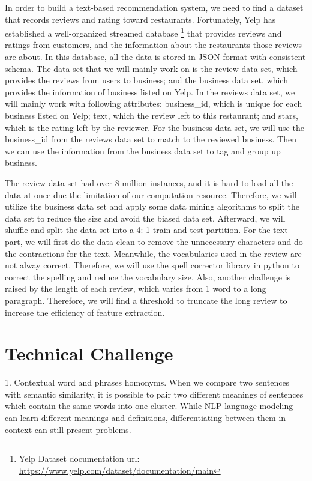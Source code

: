 \documentclass[11pt]{article}
\begin{document}
In order to build a text-based recommendation system, we need to find a dataset that records reviews and rating toward restaurants. Fortunately, Yelp has established a well-organized streamed database \footnote{Yelp Dataset documentation url: \url{https://www.yelp.com/dataset/documentation/main}} that provides reviews and ratings from customers, and the information about the restaurants those reviews are about. In this database, all the data is stored in JSON format with consistent schema. The data set that we will mainly work on is the review data set, which provides the reviews from users to business; and the business data set, which provides the information of business listed on Yelp. In the reviews data set, we will mainly work with following attributes: business\_id, which is unique for each business listed on Yelp; text, which the review left to this restaurant; and stars, which is the rating left by the reviewer. For the business data set, we will use the business\_id from the reviews data set to match to the reviewed business. Then we can use the information from the business data set to tag and group up business. 

The review data set had over 8 million instances, and it is hard to load all the data at once due the limitation of our computation resource. Therefore, we will utilize the business data set and apply some data mining algorithms to split the data set to reduce the size and avoid the biased data set. Afterward, we will shuffle and split the data set into a 4: 1 train and test partition. For the text part, we will first do the data clean to remove the unnecessary characters and do the contractions for the text. Meanwhile, the vocabularies used in the review are not alway correct. Therefore, we will use the spell corrector library in python to correct the spelling and reduce the vocabulary size. Also, another challenge is raised by the length of each review, which varies from 1 word to a long paragraph. Therefore, we will find a threshold to truncate the long review to increase the efficiency of feature extraction.


\section{Technical Challenge}

1. Contextual word and phrases homonyms. When we compare two sentences with semantic similarity, it is possible to pair two different meanings of sentences which contain the same words into one cluster. While NLP language modeling can learn different meanings and definitions, differentiating between them in context can still present problems.
\end{document}
